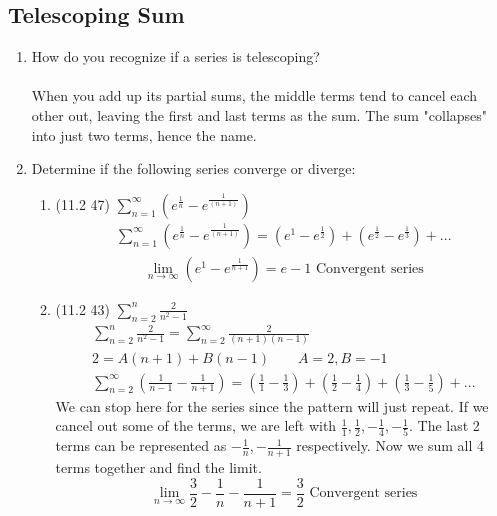 \documentclass[12pt]{article}
\begin{document}
    \subsection{Telescoping Sum}
    \begin{enumerate}
        \addtocounter{enumi}{7}\item How do you recognize if a series is telescoping?
        \\\\When you add up its partial sums, the middle terms tend to cancel each other out, leaving the first and last terms as the sum. The sum "collapses" into just two terms, hence the name.
        \item Determine if the following series converge or diverge:
        \begin{enumerate}
            \item (11.2 47) $\sum^\infty_{n=1}(e^{\frac{1}{n}}-e^{\frac{1}{(n+1)}})$
            \begin{align*}
               \sum^\infty_{n=1}(e^{\frac{1}{n}}-e^{\frac{1}{(n+1)}})=(e^1-e^\frac{1}{2})+(e^\frac{1}{2}-e^\frac{1}{3}) + ...
            \end{align*}
            \begin{align*}
                \lim_{n\to\infty}(e^1-e^\frac{1}{n+1})=e-1 \text{  Convergent series}
            \end{align*}
            \item (11.2 43) $\sum^n_{n=2}\frac{2}{n^2-1}$
            \begin{align*}
                \sum^n_{n=2}\frac{2}{n^2-1}=\sum^\infty_{n=2}\frac{2}{(n+1)(n-1)}
                \\2=A(n+1)+B(n-1) \quad\quad A=2, B=-1
                \\\sum^\infty_{n=2}\left(\frac{1}{n-1}-\frac{1}{n+1}\right)=\left(\frac{1}{1}-\frac{1}{3}\right)+
                \left(\frac{1}{2}-\frac{1}{4}\right)+\left(\frac{1}{3}-\frac{1}{5}\right)+...
            \end{align*}
            We can stop here for the series since the pattern will just repeat. If we cancel out some of the terms, we are left with $\frac{1}{1}, \frac{1}{2}, -\frac{1}{4}, -\frac{1}{5}$. The last 2 terms can be represented as
            $-\frac{1}{n}, -\frac{1}{n+1}$ respectively. Now we sum all 4 terms together and find the limit.
            \begin{equation*}
                \lim_{n\to\infty}\frac{3}{2}-\frac{1}{n}-\frac{1}{n+1}=\frac{3}{2} \text{ Convergent series}

\end{equation*}
\end{enumerate}
\end{enumerate}
\end{document}
